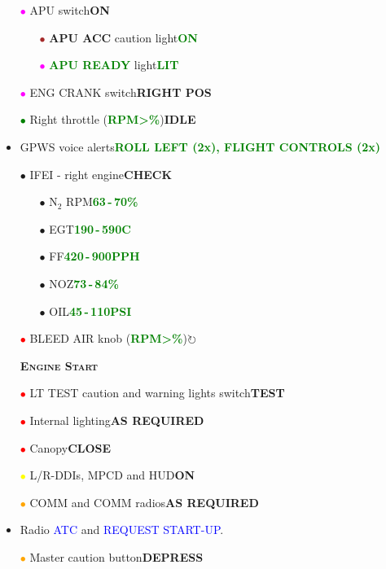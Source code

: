 \documentclass[a4paper,12pt,dvipsnames]{letter}
\newcommand{\grnb}[1]{\textcolor{Green}{\textbf{#1}}}
\newcommand{\oranb}[1]{\textcolor{BurntOrange} {\textbf{#1}}}
\newcommand{\radio}[1]{\textcolor{blue}{#1}}
\newcommand{\button}[1]{\textbf{#1}}
\newcommand{\degC}{\textdegree{}C}
\newcommand{\ok}[1]{\textcolor{Green}{\textbf{#1}}}
\newcommand{\myHead}[1]{{\LARGE\textsc{\textbf{#1}}}}
\newcommand{\bi}{\textcolor{ProcessBlue}{$\bullet$\;}}
\newcommand{\ri}{\textcolor{Red}{$\bullet$\;}}
\newcommand{\gi}{\textcolor{Green}{$\bullet$\;}}
\newcommand{\yi}{\textcolor{Yellow}{$\bullet$\;}}
\newcommand{\mi}{\textcolor{Magenta}{$\bullet$\;}}
\newcommand{\oi}{\textcolor{Orange}{$\bullet$\;}}
\renewcommand{\ni}{\textcolor{Brown}{$\bullet$\;}}
\begin{document}
{\begin{itemize}
 \item[\mi] APU switch\dotfill\button{ON}
 \begin{itemize}
  \item[\ni] \oranb{APU ACC} caution light\dotfill\ok{ON}
  \item[\mi] \grnb{APU READY} light\dotfill\ok{LIT}
 \end{itemize}
 \item[\mi] ENG CRANK switch\dotfill\button{RIGHT POS}
 \item[\gi] Right throttle (\ok{RPM\;>\%})\dotfill\button{IDLE}
 \item GPWS voice alerts\dotfill\dotfill\ok{ROLL LEFT (2x), FLIGHT CONTROLS (2x)}
 \item[\bi] IFEI - right engine\dotfill\button{CHECK}
 \begin{itemize}
  \item[\bi] N$_2$ RPM\dotfill\ok{63\,-\,70\%}
  \item[\bi] EGT\dotfill\ok{190\,-\,590\degC}
  \item[\bi] FF\dotfill\ok{420\,-\,900\;PPH}
  \item[\bi] NOZ\dotfill\ok{73\,-\,84\%}
  \item[\bi] OIL\dotfill\ok{45\,-\,110\;PSI}
 \end{itemize}
 \item[\ri] BLEED AIR knob (\ok{RPM\;>\%})\dotfill\button{$\mathbf{\circlearrowright}$\textdegree}
\end{itemize}
\newpage
\begin{itemize}
 \item[] \myHead{Engine Start} 
 \item[\ri] LT TEST caution and warning lights switch\dotfill\button{TEST}
 \item[\ri] Internal lighting\dotfill\button{AS REQUIRED}
 \item[\ri] Canopy\dotfill\button{CLOSE}
 \item[\yi] L/R-DDIs, MPCD and HUD\dotfill\button{ON}
 \item[\oi] COMM and COMM radios\dotfill\button{AS REQUIRED}
 \item Radio \radio{ATC} and \radio{REQUEST START-UP}.
 \item[\oi] Master caution button\dotfill\button{DEPRESS}

\end{itemize}}
\end{document}
